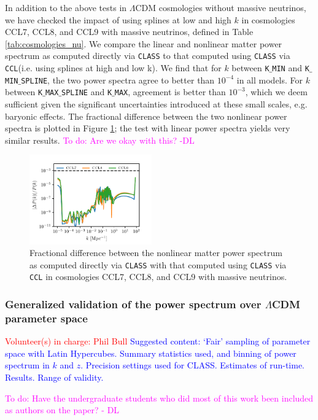 \documentclass[\docopts]{\docclass}
\newcommand{\todo}[1]{\textcolor{magenta}{To do: #1}}
\newcommand{\vol}[1]{\textcolor{red}{Volunteer(s) in charge: #1}}
\newcommand{\cont}[1]{\textcolor{blue}{Suggested content: #1}}
\newcommand{\ccl}{{\tt CCL}\xspace}
\begin{document}
In addition to the above tests in $\Lambda$CDM cosmologies without massive neutrinos, we have checked the impact of using splines at low and high $k$ in cosmologies CCL7, CCL8, and CCL9 with massive neutrinos, defined in Table \ref{tab:cosmologies_nu}. We compare the linear and nonlinear matter power spectrum as computed directly via {\tt CLASS} to that computed using {\tt CLASS} via \ccl (i.e. using splines at high and low k). We find that for $k$  between {\tt K$\_$MIN} and {\tt K$\_$MIN$\_$SPLINE}, the two power spectra agree to better than $10^{-4}$ in all models. For $k$ between {\tt K$\_$MAX$\_$SPLINE} and {\tt K$\_$MAX}, agreement is better than $10^{-3}$, which we deem sufficient given the significant uncertainties introduced at these small scales, e.g. baryonic effects. The fractional difference between the two nonlinear power spectra is plotted in Figure \ref{fig:power_nu}; the test with linear power spectra yields very similar results. \todo{Are we okay with this? -DL}

\begin{figure}
\centering
\includegraphics[width=0.47\textwidth]{pk_class_nu_NL}
\caption{Fractional difference between the nonlinear matter power spectrum as computed directly via {\tt CLASS} with that computed using {\tt CLASS} via \ccl in cosmologies CCL7, CCL8, and CCL9 with massive neutrinos.}
\label{fig:power_nu}
\end{figure}

\subsubsection{Generalized validation of the power spectrum over $\Lambda$CDM parameter space}
\vol{Phil Bull}
\cont{ `Fair' sampling of parameter space with Latin Hypercubes. Summary statistics used, and binning of power spectrum in $k$ and $z$. Precision settings used for CLASS. Estimates of run-time. Results. Range of validity.}

\todo{Have the undergraduate students who did most of this work been included as authors on the paper? - DL}
\end{document}
